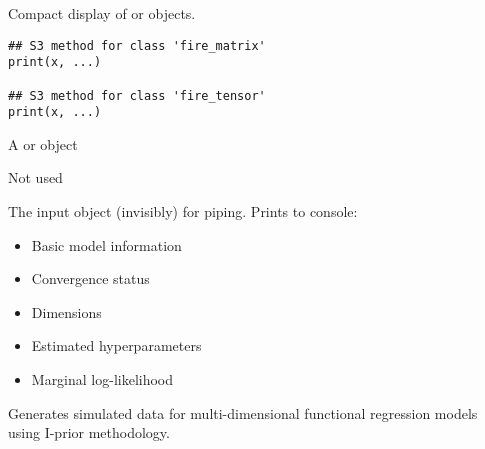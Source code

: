 \documentclass[a4paper]{book}
\begin{document}
%
\begin{Description}
Compact display of  or  objects.
\end{Description}
%
\begin{Usage}
\begin{verbatim}
## S3 method for class 'fire_matrix'
print(x, ...)

## S3 method for class 'fire_tensor'
print(x, ...)
\end{verbatim}
\end{Usage}
%
\begin{Arguments}
\begin{ldescription}
\item[\code{x}] A  or  object

\item[\code{...}] Not used
\end{ldescription}
\end{Arguments}
%
\begin{Value}
The input object (invisibly) for piping. Prints to console:
\begin{itemize}

\item{} Basic model information
\item{} Convergence status
\item{} Dimensions
\item{} Estimated hyperparameters
\item{} Marginal log-likelihood

\end{itemize}

\end{Value}
%
\begin{SeeAlso}
\end{SeeAlso}
%
\begin{Examples}
\end{Examples}
%
\begin{Description}
Generates simulated data for multi-dimensional functional regression models using
I-prior methodology.
\end{Description}
\end{document}
